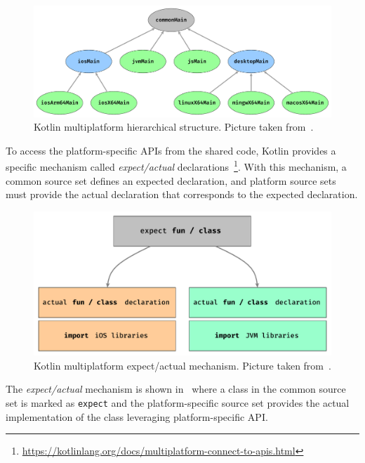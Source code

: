

\begin{figure}[ht]
	\centering
	\includegraphics[width=\linewidth]{figures/kt-mp-package-structure.pdf}
	\caption{Kotlin multiplatform hierarchical structure. Picture taken from~\cite{kotlin-package-structure}.}
	\label{fig:kotlin-multiplatform-hierarchy}
\end{figure}

To access the platform-specific APIs from the shared code, Kotlin provides a specific mechanism called \emph{expect/actual}
declarations~\footnote{\url{https://kotlinlang.org/docs/multiplatform-connect-to-apis.html}}.
With this mechanism, a common source set defines an expected declaration, and platform source sets must provide the actual declaration that
corresponds to the expected declaration.

\begin{figure}[ht]
	\centering
	\includegraphics[width=0.95\linewidth]{figures/expect-actual-kotlin.pdf}
	\caption{Kotlin multiplatform expect/actual mechanism. Picture taken from~\cite{kotlin-expect-actual}.}
	\label{fig:kotlin-multiplatform-expected-actual}
\end{figure}

The \emph{expect/actual} mechanism is shown in~ where a class in the common source set is marked as
\texttt{expect} and the platform-specific source set provides the actual implementation of the class leveraging platform-specific API.


